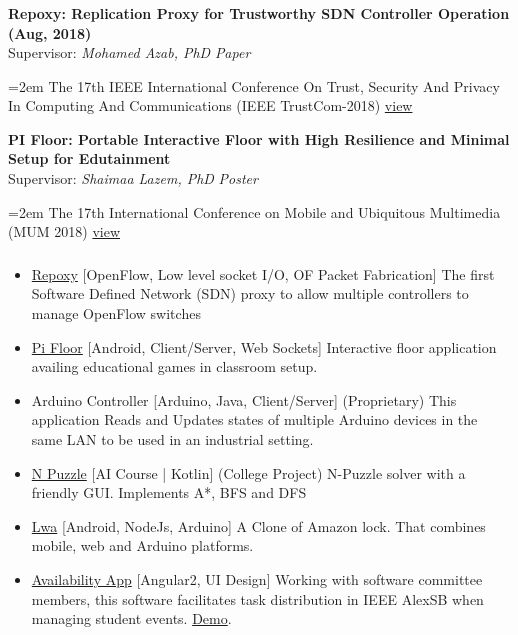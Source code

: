 \documentclass[paper=a4,fontsize=11pt]{scrartcl} %
\newcommand{\NewPart}[1]{\subsubsection{\color{AccentColor}{\textsc{#1}}}}
\newcommand{\ResearchEntry}[4]{
		\noindent \textbf{#1} \\      %
		\noindent Supervisor: \textit{#2} \hfill \textit{#3} \par         %
		\noindent\hangindent=2em\hangafter=0 \small #4 %
		\normalsize \par}
\begin{document}
\NewPart{Publications}{}
\ResearchEntry{Repoxy: Replication Proxy for Trustworthy SDN Controller Operation (Aug, 2018)}{Mohamed Azab, PhD}{Paper}{
	The 17th IEEE International Conference On Trust, Security And Privacy In Computing And Communications (IEEE TrustCom-2018) \href{https://ieeexplore.ieee.org/document/8455887/}{view}
}
\ResearchEntry{PI Floor: Portable Interactive Floor with High Resilience and Minimal Setup for Edutainment}{Shaimaa Lazem, PhD}{Poster}{
	The 17th International Conference on Mobile and Ubiquitous Multimedia (MUM 2018) \href{https://dl.acm.org/citation.cfm?doid=3282894.3289734}{view}
}
\NewPart{Projects}{}
\begin{itemize}
	\item \href{https://github.com/shakram02/Repoxy}{Repoxy} [OpenFlow, Low level socket I/O, OF Packet Fabrication] The first Software Defined Network (SDN) proxy to allow multiple controllers to manage OpenFlow switches
	\item \href{https://github.com/shakram02/PiFloor}{Pi Floor} [Android, Client/Server, Web Sockets] Interactive floor application availing educational games in classroom setup.
	\item Arduino Controller [Arduino, Java, Client/Server] (Proprietary) This application Reads and Updates states of multiple Arduino devices in the same LAN to be used in an industrial setting.

	\item \href{https://github.com/shakram02/Npuzzle-GUI}{N Puzzle} [AI Course | Kotlin] (College Project) N-Puzzle solver with a friendly GUI. Implements A*, BFS and DFS
	\item \href{https://github.com/shakram02/Lwa-Web} {Lwa} [Android, NodeJs, Arduino] A Clone of Amazon lock. That combines mobile, web and Arduino platforms.

	\item \href{https://github.com/alexsb-software/events-app}{Availability App} [Angular2, UI Design] Working with software committee members, this software facilitates task distribution in IEEE AlexSB when managing student events. \href{https://www.youtube.com/watch?v=ewxyfzxKQ8g}{Demo}.
\end{itemize}
\end{document}
